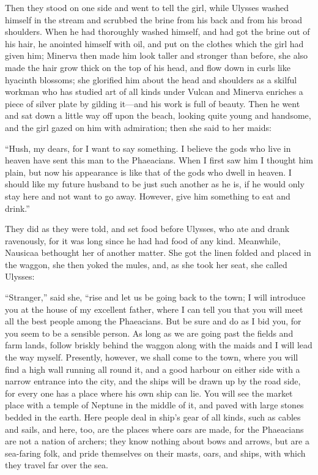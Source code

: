 Then they stood on one side and went to tell the girl, while Ulysses washed
himself in the stream and scrubbed the brine from his back and from his broad
shoulders. When he had thoroughly washed himself, and had got the brine out of
his hair, he anointed himself with oil, and put on the clothes which the girl
had given him; Minerva then made him look taller and stronger than before, she
also made the hair grow thick on the top of his head, and flow down in curls
like hyacinth blossoms; she glorified him about the head and shoulders as a
skilful workman who has studied art of all kinds under Vulcan and Minerva
enriches a piece of silver plate by gilding it—and his work is full of beauty.
Then he went and sat down a little way off upon the beach, looking quite young
and handsome, and the girl gazed on him with admiration; then she said to her
maids:

“Hush, my dears, for I want to say something. I believe the gods who live in
heaven have sent this man to the Phaeacians. When I first saw him I thought him
plain, but now his appearance is like that of the gods who dwell in heaven. I
should like my future husband to be just such another as he is, if he would
only stay here and not want to go away. However, give him something to eat and
drink.”

They did as they were told, and set food before Ulysses, who ate and drank
ravenously, for it was long since he had had food of any kind. Meanwhile,
Nausicaa bethought her of another matter. She got the linen folded and placed
in the waggon, she then yoked the mules, and, as she took her seat, she called
Ulysses:

“Stranger,” said she, “rise and let us be going back to the town; I will
introduce you at the house of my excellent father, where I can tell you that
you will meet all the best people among the Phaeacians. But be sure and do as I
bid you, for you seem to be a sensible person. As long as we are going past the
fields and farm lands, follow briskly behind the waggon along with the maids
and I will lead the way myself. Presently, however, we shall come to the town,
where you will find a high wall running all round it, and a good harbour on
either side with a narrow entrance into the city, and the ships will be drawn
up by the road side, for every one has a place where his own ship can lie. You
will see the market place with a temple of Neptune in the middle of it, and
paved with large stones bedded in the earth. Here people deal in ship’s gear of
all kinds, such as cables and sails, and here, too, are the places where oars
are made, for the Phaeacians are not a nation of archers; they know nothing
about bows and arrows, but are a sea-faring folk, and pride themselves on their
masts, oars, and ships, with which they travel far over the sea.

